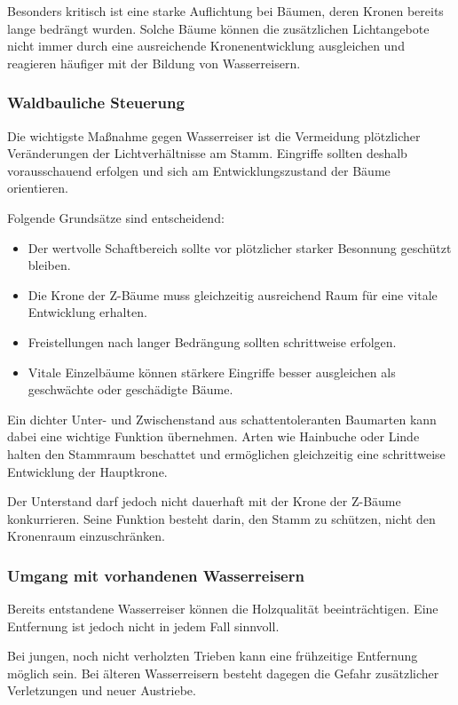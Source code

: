 \documentclass[twocolumn, bibliography=totoc, abstract=true]{scrartcl}
\begin{document}
Besonders kritisch ist eine starke Auflichtung bei Bäumen, deren Kronen bereits lange bedrängt wurden. Solche Bäume können die zusätzlichen Lichtangebote nicht immer durch eine ausreichende Kronenentwicklung ausgleichen und reagieren häufiger mit der Bildung von Wasserreisern.

\subsubsection{Waldbauliche Steuerung}

Die wichtigste Maßnahme gegen Wasserreiser ist die Vermeidung plötzlicher Veränderungen der Lichtverhältnisse am Stamm. Eingriffe sollten deshalb vorausschauend erfolgen und sich am Entwicklungszustand der Bäume orientieren.

Folgende Grundsätze sind entscheidend:

\begin{itemize}
\item Der wertvolle Schaftbereich sollte vor plötzlicher starker Besonnung geschützt bleiben.
\item Die Krone der Z-Bäume muss gleichzeitig ausreichend Raum für eine vitale Entwicklung erhalten.
\item Freistellungen nach langer Bedrängung sollten schrittweise erfolgen.
\item Vitale Einzelbäume können stärkere Eingriffe besser ausgleichen als geschwächte oder geschädigte Bäume.
\end{itemize}

Ein dichter Unter- und Zwischenstand aus schattentoleranten Baumarten kann dabei eine wichtige Funktion übernehmen. Arten wie Hainbuche oder Linde halten den Stammraum beschattet und ermöglichen gleichzeitig eine schrittweise Entwicklung der Hauptkrone.

Der Unterstand darf jedoch nicht dauerhaft mit der Krone der Z-Bäume konkurrieren. Seine Funktion besteht darin, den Stamm zu schützen, nicht den Kronenraum einzuschränken.

\subsubsection{Umgang mit vorhandenen Wasserreisern}

Bereits entstandene Wasserreiser können die Holzqualität beeinträchtigen. Eine Entfernung ist jedoch nicht in jedem Fall sinnvoll.

Bei jungen, noch nicht verholzten Trieben kann eine frühzeitige Entfernung möglich sein. Bei älteren Wasserreisern besteht dagegen die Gefahr zusätzlicher Verletzungen und neuer Austriebe.
\end{document}
